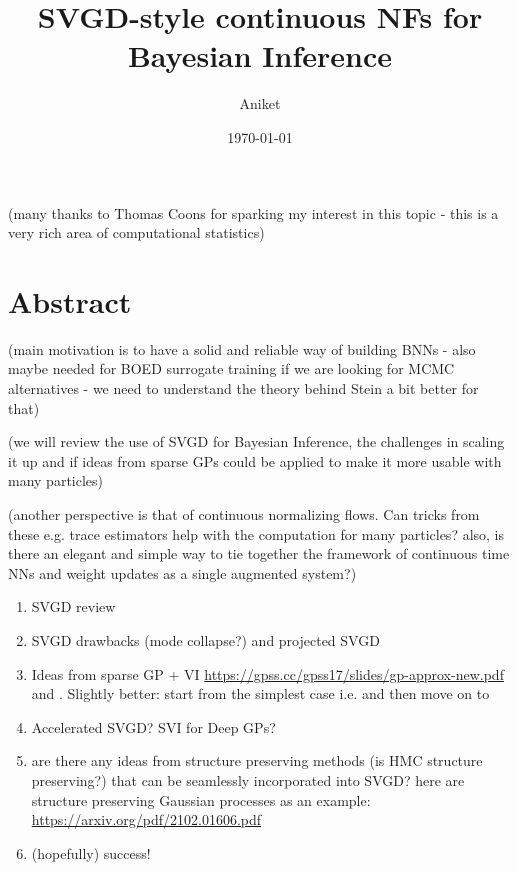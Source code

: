 \documentclass[12pt]{article}
\title{SVGD-style continuous NFs for Bayesian Inference}
\author{Aniket}
\date{\today}
\renewcommand{\[}{\left[}
\renewcommand{\]}{\right]}
\renewcommand{\(}{\left(}
\renewcommand{\)}{\right)}
\begin{document}
\maketitle

(many thanks to Thomas Coons for sparking my interest in this topic - this is a very rich area of computational statistics)

\section{Abstract}

(main motivation is to have a solid and reliable way of building BNNs - also maybe needed for BOED surrogate training if we are looking for MCMC alternatives -  we need to understand the theory behind Stein a bit better for that)

(we will review the use of SVGD for Bayesian Inference, the challenges in scaling it up and if ideas from sparse GPs could be applied to make it more usable with many particles)

(another perspective is that of continuous normalizing flows. Can tricks from these e.g. trace estimators help with the computation for many particles? also, is there an elegant and simple way to tie together the framework of continuous time NNs and weight updates as a single augmented system?)

\begin{enumerate}
    \item SVGD review \cite{liu_short_2016,liu_kernelized_2016,liu_stein_2019}

    \item SVGD drawbacks (mode collapse?) and projected SVGD \cite{chen_projected_2020}

    \item Ideas from sparse GP + VI \url{https://gpss.cc/gpss17/slides/gp-approx-new.pdf} and \cite{noack_unifying_2023}. Slightly better: start from the simplest case i.e. \cite{snelson_sparse_2005} and then move on to \cite{titsias_variational_2009,titsias_bayesian_2010}

    \item Accelerated SVGD? SVI for Deep GPs? \cite{hoffman_stochastic_2013}

    \item are there any ideas from structure preserving methods (is HMC structure preserving?) that can be seamlessly incorporated into SVGD? here are structure preserving Gaussian processes as an example: \url{https://arxiv.org/pdf/2102.01606.pdf}
    
    \item (hopefully) success!
\end{enumerate}
\end{document}
